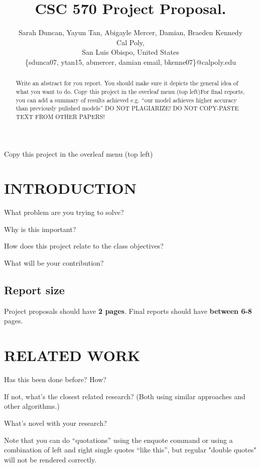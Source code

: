 \documentclass[conference]{IEEEtran}
\title{\LARGE \bf
CSC 570 Project Proposal.
}
\author{Sarah Duncan, Yayun Tan, Abigayle Mercer, Damian, Braeden Kennedy\\
Cal Poly,\\
San Luis Obispo, United States\\
\{sdunca07, ytan15, abmercer, damian email, bkenne07\}@calpoly.edu
}
\begin{document}
\maketitle
\thispagestyle{empty}
\pagestyle{empty}


\begin{abstract}

Write an abstract for you report. You should make sure it depicts the general idea of what you want to do. Copy this project in the overleaf menu (top left)For final reports, you can add a summary of results achieved e.g. \enquote{our model achieves higher accuracy than previously pulished models} DO NOT PLAGIARIZE! DO NOT COPY-PASTE TEXT FROM OTHER PAPERS!

\end{abstract}

Copy this project in the overleaf menu (top left)

\section{INTRODUCTION}

What problem are you trying to solve?

Why is this important?

How does this project relate to the class objectives?

What will be your contribution?

\subsection{Report size}

Project proposals should have \textbf{2 pages}. Final reports should have \textbf{between 6-8} pages.



\section{RELATED WORK}

Has this been done before? How?

If not, what’s the closest related research? (Both using similar approaches and other algorithms.)

What’s novel with your research?

Note that you can do \enquote{quotations} using the enquote command or using a combination of left and right single quotes ``like this'', but regular "double quotes" will not be rendered correctly.
\end{document}
